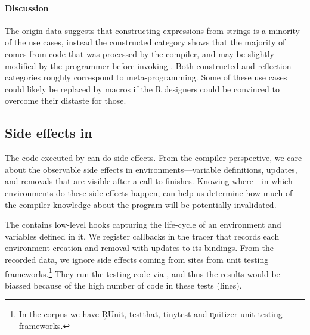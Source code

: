 \documentclass[review,screen,acmsmall,anonymous=true]{acmart}
\begin{document}
\paragraph{Discussion}
The origin data suggests that constructing expressions from strings is a
minority of the use cases, instead the constructed category shows that the
majority of \evals comes from code that was processed by the compiler, and may be
slightly modified by the programmer before invoking \eval. Both constructed and
reflection categories roughly correspond to meta-programming. Some of these use
cases could likely be replaced by macros if the R designers could be convinced
to overcome their distaste for those.

\subsection{Side effects in \eval}

The code executed by \eval can do side effects. From the compiler perspective,
we care about the observable side effects in environments---\ie variable
definitions, updates, and removals that are visible after a call to \eval
finishes. Knowing where---\ie in which environments do these side-effects
happen, can help us determine how much of the compiler knowledge about the
program will be potentially invalidated.

The \rdyntrace contains low-level hooks capturing the life-cycle of an
environment and variables defined in it. We register callbacks in the tracer
that records each environment creation and removal with updates to its
bindings. From the recorded data, we ignore side effects coming from \eval
sites from unit testing frameworks.\footnote{In the corpus we have \c{RUnit,
testthat, tinytest} and \c{unitizer} unit testing frameworks.} They run the
testing code via \eval, and thus the results would be biassed because of the
high number of code in these tests (\CranRunnableCodeTestsRnd lines).
\end{document}
